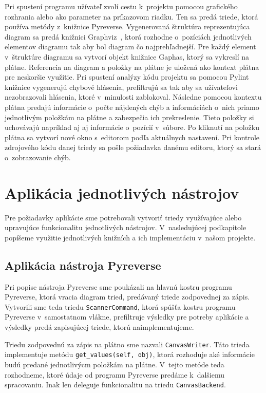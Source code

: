 \documentclass[11pt,oneside,final]{fithesis2}
\begin{document}
Pri spustení programu užívateľ zvolí cestu k~projektu pomocou grafického rozhrania alebo ako parameter na príkazovom riadku. Ten sa predá triede, ktorá používa metódy z~knižnice Pyreverse. Vygenerovaná štruktúra reprezentujúca diagram sa predá knižnici Graphviz~\cite{graphviz}, ktorá rozhodne o~pozíciách jednotlivých elementov diagramu tak aby bol diagram čo najprehľadnejší. Pre každý element v~štruktúre diagramu sa vytvorí objekt knižnice Gaphas, ktorý sa vykreslí na plátne. Referencia na diagram a položky na plátne je uložená ako kontext plátna pre neskoršie využitie. Pri spustení analýzy kódu projektu sa pomocou Pylint knižnice vygenerujú chybové hlásenia, prefiltrujú sa tak aby sa užívateľovi nezobrazovali hlásenia, ktoré v~minulosti zablokoval. Následne pomocou kontextu plátna predajú informácie o~počte nájdených chýb a informáciách o~nich priamo jednotlivým položkám na plátne a zabezpečia ich prekreslenie. Tieto položky si uchovávajú napríklad aj aj informácie o~pozícií v~súbore. Po kliknutí na položku plátna sa vytvorí nové okno s~editorom podľa aktuálnych nastavení. Pri kontrole zdrojového kódu danej triedy sa pošle požiadavka danému editoru, ktorý sa stará o~zobrazovanie chýb.

	
	\section{Aplikácia jednotlivých nástrojov}
	Pre požiadavky aplikácie sme potrebovali vytvoriť triedy využívajúce alebo upravujúce funkcionalitu jednotlivých nástrojov. V~nasledujúcej podkapitole popíšeme využitie jednotlivých knižních a ich implementáciu v~našom projekte.
	
		\subsection{Aplikácia nástroja Pyreverse}	
			Pri popise nástroja Pyreverse sme poukázali na hlavnú kostru programu Pyreverse, ktorá vracia diagram tried, predávaný triede zodpovednej za zápis. Vytvorili sme teda triedu \texttt{ScannerCommand}, ktorá spúšťa kostru programu Pyreverse v~samostatnom vlákne, prefiltruje výsledky pre potreby aplikácie a výsledky predá zapisujúcej triede, ktorú naimplementujeme.
			
			Triedu zodpovednú za zápis na plátno sme nazvali \texttt{CanvasWriter}. Táto trieda  implementuje metódu \texttt{get\_values(self, obj)}, ktorá rozhoduje aké informácie budú predané jednotlivýcm položkám na plátne. V~tejto metóde teda rozhodneme, ktoré údaje od programu Pyreverse predáme k~dalšiemu spracovaniu. Inak len deleguje funkcionalitu na triedu \texttt{CanvasBackend}.
		
\end{document}
